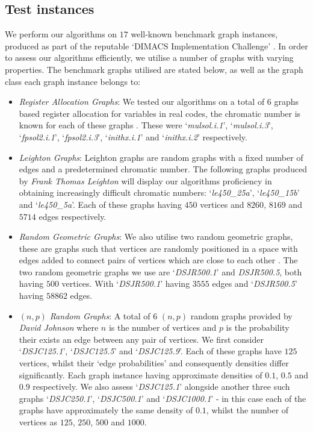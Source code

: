 \documentclass[12pt,a4paper]{article}
\begin{document}
\subsection*{Test instances}
We perform our algorithms on $17$ well-known benchmark graph instances, produced as part of the reputable `DIMACS Implementation Challenge' \cite{Johnson}. In order to assess our algorithms efficiently, we utilise a number of graphs with varying properties. The benchmark graphs utilised are stated below, as well as the graph class each graph instance belongs to:
\begin{itemize}
\renewcommand\labelitemi{\tiny$\bullet$}
\itemsep0em
\item \textit{Register Allocation Graphs}: We tested our algorithms on a total of $6$ graphs based register allocation for variables in real codes, the chromatic number is known for each of these graphs \cite{Johnson}. These were `\textit{mulsol.i.1}', `\textit{mulsol.i.3}', `\textit{fpsol2.i.1}', `\textit{fpsol2.i.3}', `\textit{inithx.i.1}' and `\textit{inithx.i.2}' respectively. 

\item \textit{Leighton Graphs}: Leighton graphs are random graphs with a fixed number of edges and a predetermined chromatic number. The following graphs produced by \textit{Frank Thomas Leighton} will display our algorithms proficiency in obtaining increasingly difficult chromatic numbers: `\textit{le450\_25a}', `\textit{le450\_15b}' and `\textit{le450\_5a}'. Each of these graphs having $450$ vertices and $8260$, $8169$ and $5714$ edges respectively.

\item \textit{Random Geometric Graphs}: We also utilise two random geometric graphs, these are graphs such that vertices are randomly positioned in a space with edges added to connect pairs of vertices which are close to each other \cite{Penrose}. The two random geometric graphs we use are `\textit{DSJR500.1}' and \textit{DSJR500.5}, both having $500$ vertices. With `\textit{DSJR500.1}' having $3555$ edges and `\textit{DSJR500.5}' having $58862$ edges.


\item $(n, p)$ \textit{Random Graphs}: A total of  $6$ $(n, p)$ random graphs provided by \textit{David Johnson} where $n$ is the number of vertices and $p$ is the probability their exists an edge between any pair of vertices. We first consider `\textit{DSJC125.1}', `\textit{DSJC125.5}' and `\textit{DSJC125.9}'. Each of these graphs have $125$ vertices, whilst their `edge probabilities' and consequently densities differ significantly. Each graph instance having approximate densities of $0.1$, $0.5$ and $0.9$ respectively. We also assess `\textit{DSJC125.1}' alongside another three such graphs `\textit{DSJC250.1}', `\textit{DSJC500.1}' and `\textit{DSJC1000.1}' - in this case each of the graphs have approximately the same density of $0.1$, whilst the number of vertices as $125$, $250$, $500$ and $1000$.
\end{itemize}
\end{document}
